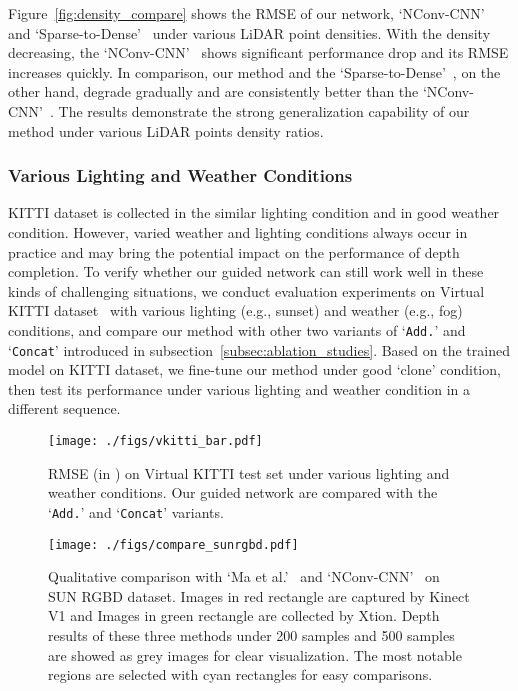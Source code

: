 \documentclass[journal]{IEEEtran}
\begin{document}
Figure~\ref{fig:density_compare} shows the RMSE of our network, `NConv-CNN'~\cite{cnn_confidence} and `Sparse-to-Dense'~\cite{self_supervised} under various LiDAR point densities.
With the density decreasing, the `NConv-CNN'~\cite{cnn_confidence} shows significant performance drop and its RMSE increases quickly.
In comparison, our method and the `Sparse-to-Dense'~\cite{self_supervised}, on the other hand, degrade gradually and are consistently better than the `NConv-CNN'~\cite{cnn_confidence}.
The results demonstrate the strong generalization capability of our method under various LiDAR points density ratios.


\subsubsection{Various Lighting and Weather Conditions}
KITTI dataset is collected in the similar lighting condition and in good weather condition.
However, varied weather and lighting conditions always occur in practice and may bring the potential impact on the performance of depth completion.
To verify whether our guided network can still work well in these kinds of challenging situations,
we conduct evaluation experiments on Virtual KITTI dataset~\cite{vkitti} with various lighting (e.g., sunset) and weather (e.g., fog) conditions,
and compare our method with other two variants of `\texttt{Add.}' and `\texttt{Concat}' introduced in subsection~\ref{subsec:ablation_studies}.
Based on the trained model on KITTI dataset, we fine-tune our method under good `clone' condition, then test its performance under various lighting and weather condition in a different sequence.   


\begin{figure}
   \begin{center}
   \texttt{[image: ./figs/vkitti\_bar.pdf]}
   \end{center}
      \caption{RMSE (in ) on Virtual KITTI test set under various lighting and weather conditions.
      Our guided network are compared with the `\texttt{Add.}' and `\texttt{Concat}' variants.}
   \label{fig:compare_vkitti}
\end{figure}

\begin{figure*}
   \begin{center}
   \texttt{[image: ./figs/compare\_sunrgbd.pdf]}
   \end{center}
      \caption{Qualitative comparison with `Ma et al.'~\cite{sparse_to_dense} and `NConv-CNN'~\cite{cnn_confidence} on SUN RGBD dataset.
      Images in red rectangle are captured by Kinect V1 and Images in green rectangle are collected by Xtion.
      Depth results of these three methods under 200 samples and 500 samples are showed as grey images for clear visualization.
      The most notable regions are selected with cyan rectangles for easy comparisons.}
   \label{fig:compare_sunrgbd}
\end{figure*}
\end{document}
